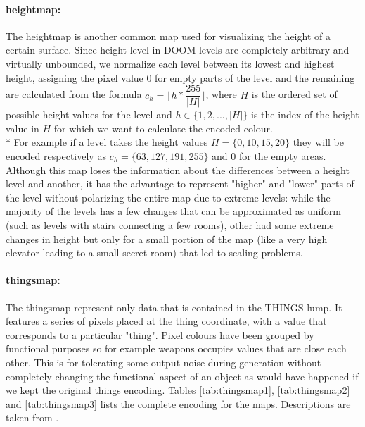 \paragraph{\gls{heightmap}:} The \gls{heightmap} is another common map used for visualizing the height of a certain surface. Since height level in DOOM levels are completely arbitrary and virtually unbounded, we normalize each level between its lowest and highest height, assigning the pixel value 0 for empty parts of the level and the remaining are calculated from the formula $ c_{h} = \lfloor h * \dfrac{255}{|H|} \rfloor $, where $ H $ is the ordered set of possible height values for the level and $ h \in \{1, 2, ..., |H| \} $ is the index of the height value in $ H $ for which we want to calculate the encoded colour. \\*
 For example if a level takes the height values $ H = \{ 0, 10, 15, 20 \} $ they will be encoded respectively as $ c_{h} = \{ 63, 127, 191, 255\} $ and 0 for the empty areas. Although this map loses the information about the differences between a height level and another, it has the advantage to represent "higher" and "lower" parts of the level without polarizing the entire map due to extreme levels: while the majority of the levels has a few changes that can be approximated as uniform (such as levels with stairs connecting a few rooms), other had some extreme changes in height but only for a small portion of the map (like a very high elevator leading to a small secret room) that led to scaling problems.
 
\paragraph{\gls{thingsmap}:} The \gls{thingsmap} represent only data that is contained in the THINGS lump. It features a series of pixels placed at the thing coordinate, with a value that corresponds to a particular "thing". Pixel colours have been grouped by functional purposes so for example weapons occupies values that are close each other. This is for tolerating some output noise during generation without completely changing the functional aspect of an object as would have happened if we kept the original things encoding. Tables \ref{tab:thingsmap1}, \ref{tab:thingsmap2} and \ref{tab:thingsmap3} lists the complete encoding for the maps. Descriptions are taken from \cite{wiki:thingtypes}.

